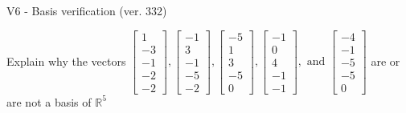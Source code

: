 \begin{exercise}
  \begin{exerciseTitle}V6 - Basis verification (ver. 332)\end{exerciseTitle}
  \begin{exerciseStatement}
    Explain why the vectors \(\left[\begin{array}{r}
1 \\
-3 \\
-1 \\
-2 \\
-2
\end{array}\right] , \left[\begin{array}{r}
-1 \\
3 \\
-1 \\
-5 \\
-2
\end{array}\right] , \left[\begin{array}{r}
-5 \\
1 \\
3 \\
-5 \\
0
\end{array}\right] , \left[\begin{array}{r}
-1 \\
0 \\
4 \\
-1 \\
-1
\end{array}\right] , \text{ and } \left[\begin{array}{r}
-4 \\
-1 \\
-5 \\
-5 \\
0
\end{array}\right]\) are or are not a basis of \(\mathbb{R}^5\)	



\end{exerciseStatement}
\end{exercise}
